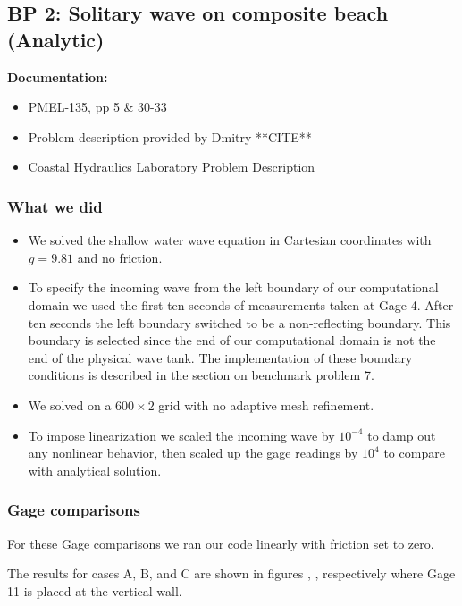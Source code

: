 \newsection

\subsection{BP 2:
 Solitary wave on composite beach (Analytic)}

{\bf Documentation:}

\begin{itemize}
\item PMEL-135, pp 5 \& 30-33 \cite{SynolakisBernard:pmel135}
\item Problem description provided by Dmitry **CITE**
\item Coastal Hydraulics Laboratory Problem Description \cite{CHLBP2}
\end{itemize}

\subsubsection{What we did}
\begin{itemize}

\item We solved the shallow water wave equation in Cartesian coordinates with $g = 9.81$ and no friction.
\item To specify the incoming wave from the left boundary of our computational domain we used the first ten seconds of  measurements taken at Gage 4.  After ten seconds the left boundary switched to be a non-reflecting boundary.  This boundary is selected since the end of our computational domain is not the end of the physical wave tank.  The implementation of these boundary conditions is described in the section on benchmark problem 7. 
\item We solved on a $600 \times 2$ grid with no adaptive mesh refinement.
\item To impose linearization we scaled the incoming wave by $10^{-4}$ to damp out any nonlinear behavior, then scaled up the gage readings by $10^4$ to compare with analytical solution.
\end{itemize}

\subsubsection{Gage comparisons}
For these Gage comparisons we ran our code linearly with friction set to zero. 

The results for cases A, B, and C are shown in figures , ,  respectively where Gage 11 is placed at the vertical wall.

